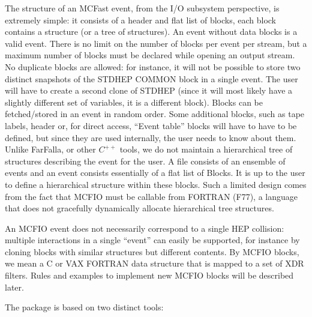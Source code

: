 The structure of an MCFast event, from the I/O subsystem perspective, is
extremely simple: it consists of a header and flat list of blocks, each block
contains  a structure (or a tree of structures). An event without data blocks
is a valid event. There is no limit on the number of blocks per event per
stream, but a maximum number of blocks must be declared while opening an output
stream.    No duplicate blocks are allowed:  for instance, it will not be
possible to store two distinct snapshots of the STDHEP COMMON block in a single
event. The user will have to  create a second clone of STDHEP (since it will
most likely have a slightly different set of variables, it is a different
block).  Blocks can be fetched/stored in an  event in random order. Some
additional blocks, such as tape labels, header or, for direct access, ``Event
table'' blocks will have to have to be defined, but since they are used
internally, the user needs to know about them.  Unlike FarFalla, or other 
$C^{++}$ tools, we do not maintain a hierarchical tree of structures 
describing the event for the user. A file consists of an ensemble of events 
and an event consists essentially of a flat list of Blocks. It is up to the 
user to define a hierarchical structure within these blocks. Such a limited design 
comes from the fact that MCFIO must be callable from FORTRAN (F77), a language
that does not gracefully dynamically allocate hierarchical tree 
structures.

	An MCFIO event does not necessarily correspond to a single HEP 
collision:  multiple interactions in a single ``event'' can easily be 
supported, for instance by cloning blocks with similar structures but 
different contents. By MCFIO blocks, we mean a C or VAX FORTRAN data 
structure that is mapped to a set of XDR filters. Rules and examples to 
implement new MCFIO blocks will be described later.   

	The package is based on two distinct tools: 
	
